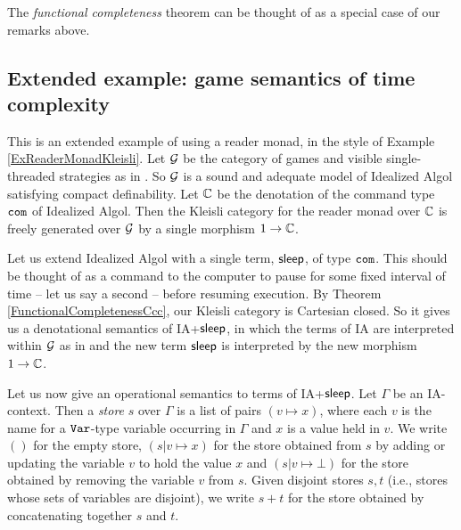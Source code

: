 \documentclass{article}
\begin{document}
The \emph{functional completeness} theorem \cite{FunctionalCompleteness} can be thought of as a special case of our remarks above.

\subsection{Extended example: game semantics of time complexity}
This is an extended example of using a reader monad, in the style of Example \ref{ExReaderMonadKleisli}.
Let $\mathcal G$ be the category of games and visible single-threaded strategies as in \cite{SamsonGuyIAActive}.  
So $\mathcal G$ is a sound and adequate model of Idealized Algol satisfying compact definability.
Let $\mathbb{C}$ be the denotation of the command type ${\mathtt{com}}$ of Idealized Algol.  
Then the Kleisli category for the reader monad over $\mathbb{C}$ is freely generated over $\mathcal G$ by a single morphism $1 \to \mathbb{C}$.  

Let us extend Idealized Algol with a single term, ${\mathsf{sleep}}$, of type ${\mathtt{com}}$.
This should be thought of as a command to the computer to pause for some fixed interval of time -- let us say a second -- before resuming execution.
By Theorem \ref{FunctionalCompletenessCcc}, our Kleisli category is Cartesian closed.
So it gives us a denotational semantics of IA+${\mathsf{sleep}}$, in which the terms of IA are interpreted within $\mathcal G$ as in \cite{SamsonGuyIAActive} and the new term ${\mathsf{sleep}}$ is interpreted by the new morphism $1 \to \mathbb{C}$.

Let us now give an operational semantics to terms of IA+${\mathsf{sleep}}$.  
Let $\Gamma$ be an IA-context.
Then a \emph{store} $s$ over $\Gamma$ is a list of pairs $(v\mapsto x)$, where each $v$ is the name for a ${\mathtt{Var}}$-type variable occurring in $\Gamma$ and $x$ is a value held in $v$.  
We write $()$ for the empty store, $(s\vert v\mapsto x)$ for the store obtained from $s$ by adding or updating the variable $v$ to hold the value $x$ and $(s\vert v\mapsto \bot)$ for the store obtained by removing the variable $v$ from $s$.
Given disjoint stores $s,t$ (i.e., stores whose sets of variables are disjoint), we write $s+t$ for the store obtained by concatenating together $s$ and $t$.  
\end{document}
